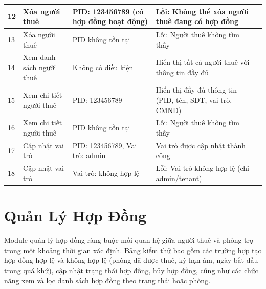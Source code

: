 \documentclass[12pt,a4paper]{article}
\begin{document}
\begin{table}[h!]
\begin{small}
\begin{tabularx}{\textwidth}{|p{0.8cm}|p{2.5cm}|p{3cm}|p{3cm}|p{2.5cm}|}
    12 & Xóa người thuê & PID: 123456789 (có hợp đồng hoạt động) & Lỗi: Không thể xóa người thuê đang có hợp đồng & \\ \hline

    13 & Xóa người thuê & PID không tồn tại & Lỗi: Người thuê không tìm thấy & \\ \hline

    14 & Xem danh sách người thuê & Không có điều kiện & Hiển thị tất cả người thuê với thông tin đầy đủ & \\ \hline

    15 & Xem chi tiết người thuê & PID: 123456789 & Hiển thị đầy đủ thông tin (PID, tên, SĐT, vai trò, CMND) & \\ \hline

    16 & Xem chi tiết người thuê & PID không tồn tại & Lỗi: Người thuê không tìm thấy & \\ \hline

    17 & Cập nhật vai trò & PID: 123456789, Vai trò: admin & Vai trò được cập nhật thành công & \\ \hline

    18 & Cập nhật vai trò & Vai trò: không hợp lệ & Lỗi: Vai trò không hợp lệ (chỉ admin/tenant) & \\ \hline

    \end{tabularx}
    \end{small}
\end{table}

\newpage

\section{Quản Lý Hợp Đồng}

Module quản lý hợp đồng ràng buộc mối quan hệ giữa người thuê và phòng trọ trong một khoảng thời gian xác định. Bảng kiểm thử bao gồm các trường hợp tạo hợp đồng hợp lệ và không hợp lệ (phòng đã được thuê, kỳ hạn âm, ngày bắt đầu trong quá khứ), cập nhật trạng thái hợp đồng, hủy hợp đồng, cũng như các chức năng xem và lọc danh sách hợp đồng theo trạng thái hoặc phòng.
\end{document}
